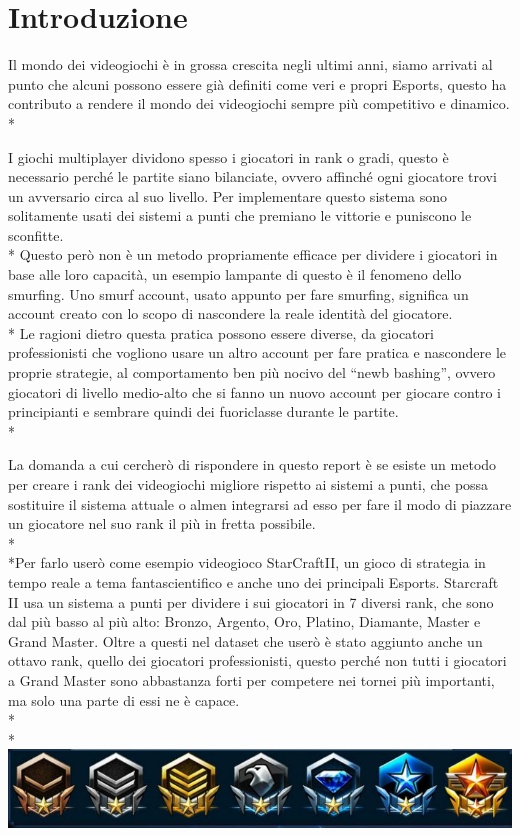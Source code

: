 \section{Introduzione}\label{sec:introduzione}
\normalsize
Il mondo dei videogiochi è in grossa crescita negli ultimi anni, siamo arrivati al punto che alcuni possono essere già definiti come veri e propri Esports, questo ha contributo a rendere il mondo dei videogiochi sempre più competitivo e dinamico. \\*\par
I giochi multiplayer dividono spesso i giocatori in rank o gradi, questo è necessario perché le partite siano bilanciate, ovvero affinché ogni giocatore trovi un avversario circa al suo livello. Per implementare questo sistema sono solitamente usati dei sistemi a punti che premiano le vittorie e puniscono le sconfitte. \\*
Questo però non è un metodo propriamente efficace per dividere i giocatori in base alle loro capacità, un esempio lampante di questo è il fenomeno dello smurfing. Uno smurf account, usato appunto per fare smurfing, significa un account creato con lo scopo di nascondere la reale identità del giocatore.\\*
Le ragioni dietro questa pratica possono essere diverse, da giocatori professionisti che vogliono usare un altro account per fare pratica e nascondere le proprie strategie, al comportamento ben più nocivo del “newb bashing”, ovvero giocatori di livello medio-alto che si fanno un nuovo account per giocare contro i principianti e sembrare quindi dei fuoriclasse durante le partite. \\*\par
La domanda a cui cercherò di rispondere in questo report è se esiste un metodo per creare i rank dei videogiochi migliore rispetto ai sistemi a punti, che possa sostituire il sistema attuale o almen integrarsi ad esso per fare il modo di piazzare un giocatore nel suo rank il più in fretta possibile.\\*\\*Per farlo userò come esempio videogioco StarCraftII, un gioco di strategia in tempo reale a tema fantascientifico e anche uno dei principali Esports. Starcraft II usa un sistema a punti per dividere i sui giocatori in 7 diversi rank, che sono dal più basso al più alto: Bronzo, Argento, Oro,  Platino, Diamante, Master e Grand Master. Oltre a questi nel dataset che userò è stato aggiunto anche un ottavo rank, quello dei giocatori professionisti, questo perché non tutti i giocatori a Grand Master sono abbastanza forti per competere nei tornei più importanti, ma solo una parte di essi ne è capace. \\*\\*
\includegraphics[scale=0.74]{../figures/ranks starcraft II.PNG} 
\clearpage
